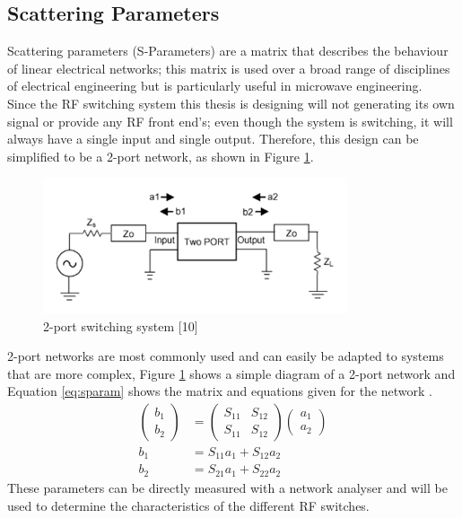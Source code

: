 \documentclass[12pt,openany,a4paper]{book}
\begin{document}
\subsection{Scattering Parameters}
Scattering parameters (S-Parameters) are a matrix that describes the behaviour of linear electrical networks; this matrix is used over a broad range of disciplines of electrical engineering but is particularly useful in microwave engineering.\\
Since the RF switching system this thesis is designing will not generating its own signal or provide any RF front end's; even though the system is switching, it will always have a single input and single output. Therefore, this design can be simplified to be a 2-port network, as shown in Figure \ref{fig:sparam}.
\begin{figure}[H]
	\centering
    \includegraphics[width=0.8\textwidth]{sparam.png}
	\caption{2-port switching system [10]}
	\label{fig:sparam}
\end{figure} 
2-port networks are most commonly used and can easily be adapted to systems that are more complex, Figure \ref{fig:sparam} shows a simple diagram of a 2-port network and Equation \ref{eq:sparam} shows the matrix and equations given for the network \cite{ref9}.
\begin{align}
\left( \begin{array}{c}
b_1 \\
b_2 \end{array} \right) &=
\left( \begin{array}{cc}
S_{11} & S_{12} \\
S_{11} & S_{12} \end{array} \right)
\left( \begin{array}{c}
a_1 \\
a_2 \end{array} \right) \label{eq:sparam} \\
b_1 &= S_{11}a_1+S_{12}a_2 \nonumber \\
b_2 &= S_{21}a_1+S_{22}a_2 \nonumber
\end{align}
These parameters can be directly measured with a network analyser and will be used to determine the characteristics of the different RF switches.
\end{document}
